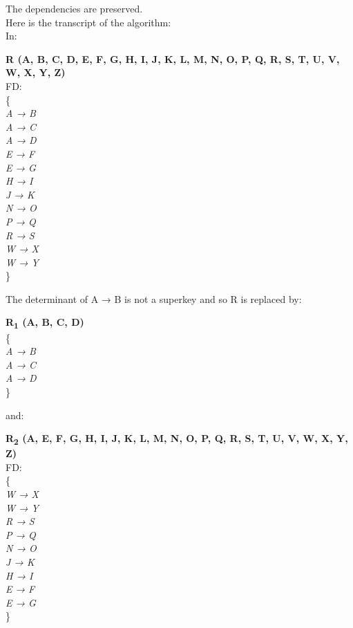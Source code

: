 The dependencies are preserved.\\

Here is the transcript of the algorithm:\\

In:\\

\begin{adjustwidth}{2cm}{}
\textbf{R (A, B, C, D, E, F, G, H, I, J, K, L, M, N, O, P, Q, R, S, T, U, V, W, X, Y, Z)}\\
FD: \\
\{ \\
\textit{
A → B\\
A → C\\
A → D\\
E → F\\
E → G\\
H → I\\
J → K\\
N → O\\
P → Q\\
R → S\\
W → X\\
W → Y\\
}
\}\\
\end{adjustwidth}
 
The determinant of A → B is not a superkey and so R is replaced by:\\

\begin{adjustwidth}{2cm}{}
\textbf{R\textsubscript{1} (A, B, C, D)}\\
\{\\ 
\textit{
A → B\\
A → C\\
A → D\\
} 
\}\\
\end{adjustwidth} 
and:\\ 

\begin{adjustwidth}{2cm}{}
\textbf{R\textsubscript{2} (A, E, F, G, H, I, J, K, L, M, N, O, P, Q, R, S, T, U, V, W, X, Y, Z)}\\
FD:\\ 
\{ \\ 
\textit{
W → X\\
W → Y\\
R → S\\
P → Q\\
N → O\\
J → K\\
H → I\\
E → F\\
E → G\\
}
\}\\ \\
\end{adjustwidth} 

